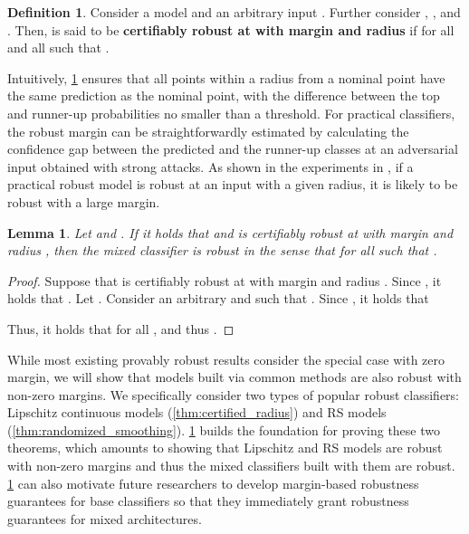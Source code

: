 \documentclass[11pt, letterpaper]{article}
\theoremstyle{plain}
\newtheorem{lemma}{Lemma}
\theoremstyle{definition}
\newtheorem{definition}{Definition}
\begin{document}
\begin{definition} \label{def:robust_with_margin}
	Consider a model  and an arbitrary input . Further consider , , and . Then,  is said to be \textbf{certifiably robust at  with margin  and radius } if  for all  and all  such that .
\end{definition}

Intuitively, \cref{def:robust_with_margin} ensures that all points within a radius from a nominal point have the same prediction as the nominal point, with the difference between the top and runner-up probabilities no smaller than a threshold. For practical classifiers, the robust margin can be straightforwardly estimated by calculating the confidence gap between the predicted and the runner-up classes at an adversarial input obtained with strong attacks. As shown in the experiments in , if a practical robust model is robust at an input with a given radius, it is likely to be robust with a large margin.

\begin{lemma}
	\label{lem:certified_radius}
	Let  and . If it holds that  and  is certifiably robust at  with margin  and radius , then the mixed classifier  is robust in the sense that  for all  such that .
\end{lemma}

\begin{proof}
Suppose that  is certifiably robust at  with margin  and radius . Since , it holds that . Let . Consider an arbitrary  and  such that . Since , it holds that

Thus, it holds that  for all , and thus .
\end{proof}

While most existing provably robust results consider the special case with zero margin, we will show that models built via common methods are also robust with non-zero margins. We specifically consider two types of popular robust classifiers: Lipschitz continuous models (\cref{thm:certified_radius}) and RS models (\cref{thm:randomized_smoothing}). \cref{lem:certified_radius} builds the foundation for proving these two theorems, which amounts to showing that Lipschitz and RS models are robust with non-zero margins and thus the mixed classifiers built with them are robust. \cref{lem:certified_radius} can also motivate future researchers to develop margin-based robustness guarantees for base classifiers so that they immediately grant robustness guarantees for mixed architectures.
\end{document}
